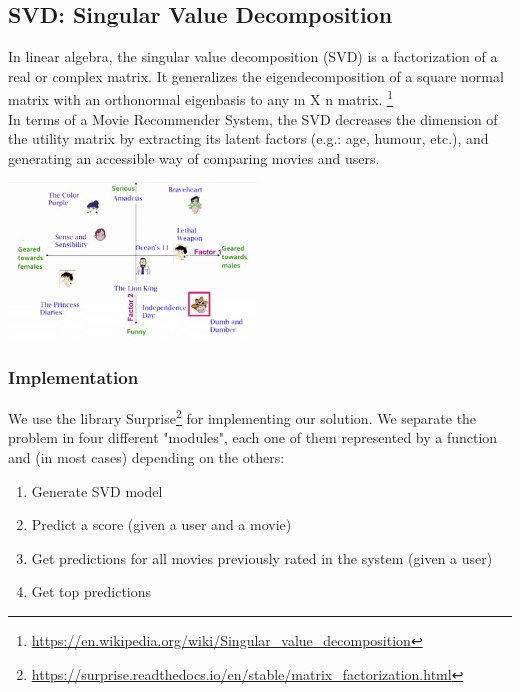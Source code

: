 \subsection{SVD: Singular Value Decomposition}
In linear algebra, the singular value decomposition (SVD) is a factorization of
a real or complex matrix. It generalizes the eigendecomposition of a square normal
matrix with an orthonormal eigenbasis to any {m X n} matrix.
\footnote{\href{https://en.wikipedia.org/wiki/Singular\_value\_decomposition}{https://en.wikipedia.org/wiki/Singular\_value\_decomposition}}\\
In terms of a Movie Recommender System, the SVD decreases the dimension of the utility matrix
by extracting its latent factors (e.g.: age, humour, etc.), and generating an accessible way of
comparing movies and users.\\
\begin{center}
    \captionsetup{type=figure}
    \includegraphics[width=250px]{images/svd-00.png}
\end{center}
\subsubsection*{Implementation}
We use the library Surprise\footnote{\href{https://surprise.readthedocs.io/en/stable/matrix\_factorization.html}{https://surprise.readthedocs.io/en/stable/matrix\_factorization.html}}
for implementing our solution. We separate the problem in four different "modules", each one of them represented by a function
and (in most cases) depending on the others:
\begin{enumerate}
    \item Generate SVD model
    \item Predict a score (given a user and a movie)
    \item Get predictions for all movies previously rated in the system (given a user)
    \item Get top predictions
\end{enumerate}
